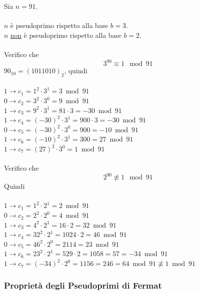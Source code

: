 \documentclass[a4paper,12pt, oneside]{book}
\begin{document}
\begin{shaded}
	\begin{esempio}
		Sia $n = 91$.\\\\
		$n$ è pseudoprimo rispetto alla base $b=3$.\\
		$n$ \underline{non} è pseudoprimo rispetto alla base $b=2$.\\\\
		Verifico che
		$$3^{90} \equiv 1 \mod 91$$
		$90_{10} = (1011010)_{2}$, quindi\\\\
		$1 \rightarrow c_1 = 1^2 \cdot 3^1 = 3 \bmod 91$\\
		$0 \rightarrow c_2 = 3^2 \cdot 3^0 = 9 \bmod 91$\\
		$1 \rightarrow c_3 = 9^2 \cdot 3^1 = 81 \cdot 3 = -30 \bmod 91$\\
		$1 \rightarrow c_4 = (-30)^2 \cdot 3^1 = 900 \cdot 3 = -30 \bmod 91$\\
		$0 \rightarrow c_5 = (-30)^2 \cdot 3^0 = 900 = -10 \bmod 91$\\
		$1 \rightarrow c_6 = (-10)^2 \cdot 3^1 = 300 = 27 \bmod 91$\\
		$1 \rightarrow c_7 = (27)^2 \cdot 3^0 = 1 \bmod 91$\\\\
		Verifico che
		$$2^{90} \not\equiv 1 \mod 91$$
		Quindi\\\\
		$1 \rightarrow c_1 = 1^2 \cdot 2^1 = 2 \bmod 91$\\
		$0 \rightarrow c_2 = 2^2 \cdot 2^0 = 4 \bmod 91$\\
		$1 \rightarrow c_3 = 4^2 \cdot 2^1 = 16 \cdot 2 = 32 \bmod 91$\\
		$1 \rightarrow c_4 = 32^2 \cdot 2^1 = 1024 \cdot 2 = 46 \bmod 91$\\
		$0 \rightarrow c_5 = 46^2 \cdot 2^0 = 2114 = 23 \bmod 91$\\
		$1 \rightarrow c_6 = 23^2 \cdot 2^1 = 529 \cdot 2 = 1058 = 57 = -34 \bmod 91$\\
		$1 \rightarrow c_7 = (-34)^2 \cdot 2^0 = 1156 = 246 = 64 \bmod 91 \not\equiv 1 \bmod 91$
	\end{esempio}
\end{shaded}

\subsubsection{Proprietà degli Pseudoprimi di Fermat}
\end{document}
